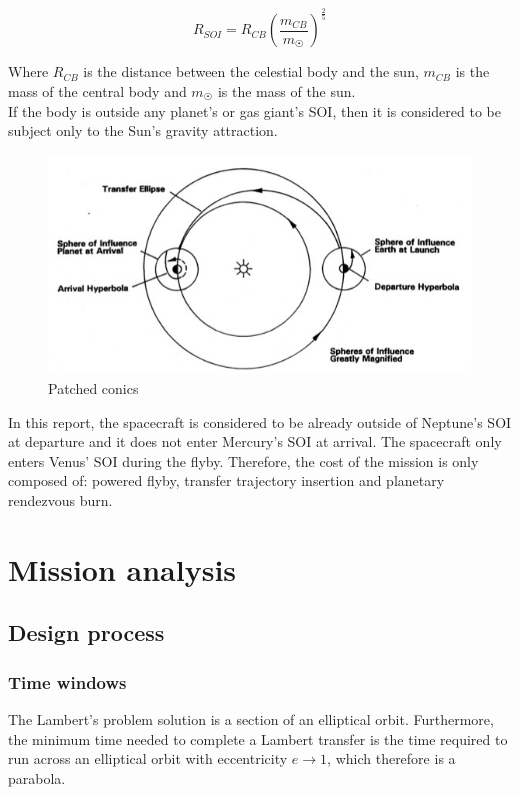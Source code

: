 \documentclass[11pt,a4paper]{report}
\begin{document}
\begin{equation*}
    R_{SOI} = R_{CB}\left(\frac{m_{CB}}{m_{\astrosun}}\right)^{\frac{2}{5}}
\end{equation*}

Where $R_{CB}$ is the distance between the celestial body and the sun, $m_{CB}$ is the mass of the central body and $m_{\astrosun}$ is the mass of the sun.\\ 
If the body is outside any planet’s or gas giant’s SOI, then it is considered to be subject only to the Sun’s gravity attraction.\\

\begin{figure}[H]
\includegraphics[width = \textwidth]{patched_conics.jpg}
\caption{Patched conics}
\end{figure}

In this report, the spacecraft is considered to be already outside of Neptune’s SOI at departure and it does not enter Mercury’s SOI at arrival. The spacecraft only enters Venus’ SOI during the flyby. Therefore, the cost of the mission is only composed of: powered flyby, transfer trajectory insertion and planetary rendezvous burn.

\section{Mission analysis}

\subsection{Design process}
\subsubsection{Time windows}
The Lambert’s problem solution is a section of an elliptical orbit. Furthermore, the minimum time needed to complete a Lambert transfer is the time required to run across an elliptical orbit with eccentricity $e\rightarrow1$, which therefore is a parabola.
\end{document}

